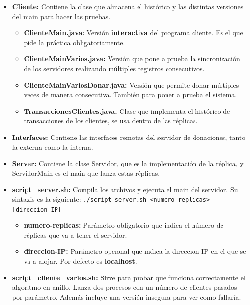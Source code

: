 \documentclass{article}
\begin{document}
\begin{itemize}
    \item \textbf{Cliente: }Contiene la clase que almacena el histórico y las distintas versiones del main para hacer las pruebas.

    \begin{itemize}
        \item \textbf{ClienteMain.java: }Versión \textbf{interactiva} del programa cliente. Es el que pide la práctica obligatoriamente.
        \item \textbf{ClienteMainVarios.java: }Versión que pone a prueba la sincronización de los servidores realizando múltiples registros consecutivos.
        \item \textbf{ClienteMainVariosDonar.java: }Versión que permite donar múltiples veces de manera consecutiva. También para poner a prueba el sistema.
        \item \textbf{TransaccionesClientes.java: }Clase que implementa el histórico de transacciones de los clientes, se usa dentro de las réplicas.
    \end{itemize}

    \item \textbf{Interfaces: }Contiene las interfaces remotas del servidor de donaciones, tanto la externa como la interna.
    
    \item \textbf{Server: }Contiene la clase Servidor, que es la implementación de la réplica, y ServidorMain es el main que lanza estas réplicas.
    
    \item \textbf{script\_server.sh: }Compila los archivos y ejecuta el main del servidor. Su sintaxis es la siguiente: \verb|./script_server.sh <numero-replicas> [direccion-IP]|
    
    \begin{itemize}
        \item \textbf{numero-replicas: }Parámetro obligatorio que indica el número de réplicas que va a tener el servidor.
        \item \textbf{direccion-IP: }Parámetro opcional que indica la dirección IP en el que se va a alojar. Por defecto es \textbf{localhost}.
    \end{itemize}

    \item \textbf{script\_cliente\_varios.sh: }Sirve para probar que funciona correctamente el algoritmo en anillo. Lanza dos procesos con un número de clientes pasados por parámetro. Además incluye una versión insegura para ver como fallaría. 
    

\end{itemize}
\end{document}
